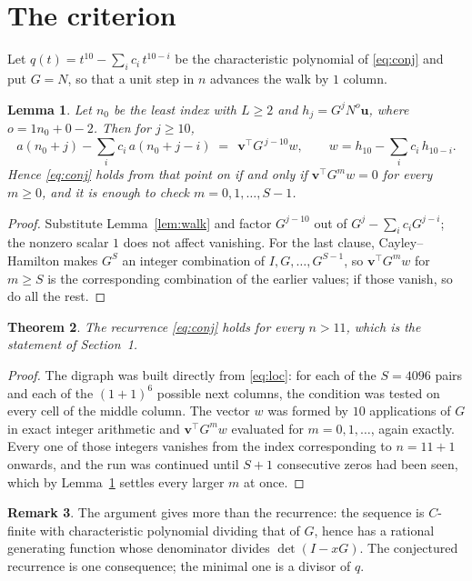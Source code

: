 \documentclass[11pt,a4paper]{article}
\theoremstyle{plain}
\newtheorem{theorem}{Theorem}
\newtheorem{lemma}[theorem]{Lemma}
\theoremstyle{definition}
\newtheorem{remark}[theorem]{Remark}
\begin{document}
\section{The criterion}

Let $q(t)=t^{10}-\sum_i c_i\,t^{10-i}$ be the characteristic polynomial of
\eqref{eq:conj} and put $G=N$, so that a unit step in $n$ advances the walk by
$1$ column.

\begin{lemma}\label{lem:crit}
Let $n_0$ be the least index with $L\ge2$ and $h_j=G^{j}N^{o}\mathbf{u}$, where
$o=1n_0+0-2$. Then for $j\ge10$,
\[
a(n_0+j)-\sum_i c_i\,a(n_0+j-i)\;=\;\,\mathbf{v}^{\!\top}G^{\,j-10}w,
\qquad w=h_{10}-\sum_i c_i\,h_{10-i} .
\]
Hence \eqref{eq:conj} holds from that point on if and only if
$\mathbf{v}^{\!\top}G^{m}w=0$ for every $m\ge0$, and it is enough to check
$m=0,1,\dots,S-1$.
\end{lemma}

\begin{proof}
Substitute Lemma~\ref{lem:walk} and factor $G^{j-10}$ out of
$G^{j}-\sum_ic_iG^{j-i}$; the nonzero scalar $1$ does not affect
vanishing. For the last clause, Cayley--Hamilton makes $G^{S}$ an integer combination of
$I,G,\dots,G^{S-1}$, so $\mathbf{v}^{\!\top}G^{m}w$ for $m\ge S$ is the corresponding
combination of the earlier values; if those vanish, so do all the rest.
\end{proof}

\begin{theorem}
The recurrence \eqref{eq:conj} holds for every $n>11$, which is the statement of
Section~1.
\end{theorem}

\begin{proof}
The digraph was built directly from \eqref{eq:loc}: for each of the $S=4096$ pairs and each
of the $(1+1)^{6}$ possible next columns, the condition was tested on every cell of
the middle column. The vector $w$ was formed by $10$ applications of $G$ in exact integer
arithmetic and $\mathbf{v}^{\!\top}G^{m}w$ evaluated for $m=0,1,\dots$, again exactly.
Every one of those integers vanishes from the index corresponding to $n=11+1$ onwards,
and the run was continued until $S+1$ consecutive zeros had been seen, which by
Lemma~\ref{lem:crit} settles every larger $m$ at once.
\end{proof}

\begin{remark}
The argument gives more than the recurrence: the sequence is $C$-finite with characteristic
polynomial dividing that of $G$, hence has a rational generating function whose denominator
divides $\det(I-xG)$. The conjectured recurrence is one consequence; the minimal one is a
divisor of $q$.
\end{remark}
\end{document}
